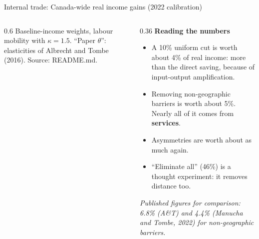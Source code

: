 \documentclass[aspectratio=169,9pt,t]{beamer}
\newcommand{\key}[1]{\textbf{\color{ipnavy}#1}}
\newcommand{\plain}[1]{{\color{ipgrey}\small\itshape #1}}
\begin{document}
\begin{frame}{Internal trade: Canada-wide real income gains (2022 calibration)}
\begin{columns}[T]
\begin{column}{0.6\textwidth}
      \smallskip
      {\tiny\color{ipgrey} Baseline-income weights, labour mobility with
      $\kappa=1.5$. ``Paper $\theta$'': elasticities of Albrecht and Tombe
      (2016). Source: README.md.}
    \end{column}
    \begin{column}{0.36\textwidth}
      \textbf{Reading the numbers}
      \begin{itemize}
        \item A 10\% uniform cut is worth about 4\% of real income: more
              than the direct saving, because of input-output
              amplification.
        \item Removing non-geographic barriers is worth about 5\%. Nearly
              all of it comes from \key{services}.
        \item Asymmetries are worth about as much again.
        \item ``Eliminate all'' (46\%) is a thought experiment: it
              removes distance too.
      \end{itemize}
      \plain{Published figures for comparison: 6.8\% (A\&T) and 4.4\%
      (Manucha and Tombe, 2022) for non-geographic barriers.}
    \end{column}
  \end{columns}
\end{frame}
\end{document}
